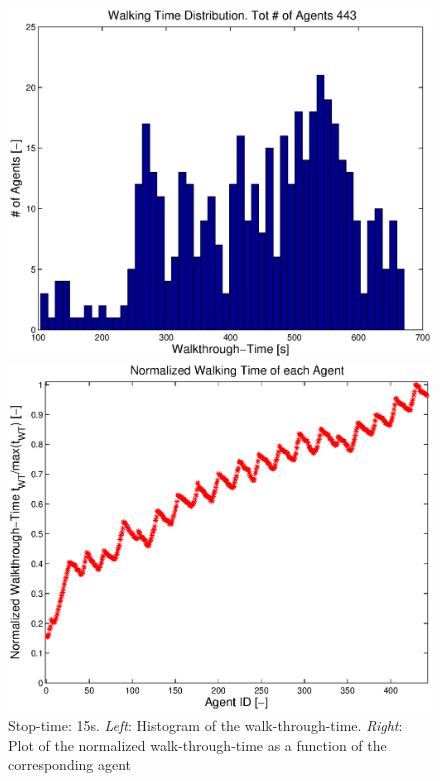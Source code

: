 \documentclass[11pt]{article}
\begin{document}
\begin{figure}[h]
 	\begin{minipage}{0.48\textwidth}
		\includegraphics[width = \textwidth]{Images/RESULTS03_Stop15/WalkingTimeHist.eps}
 	 \end{minipage}
  	\hfill
  	\begin{minipage}{0.48\textwidth}
   		 \includegraphics[width = \textwidth]{Images/RESULTS03_Stop15/NormalizedWalkingTimePlot.eps}
  	\end{minipage}
  	\caption{Stop-time: 15s. \emph{Left}: Histogram of the walk-through-time. \emph{Right}: Plot of the normalized walk-through-time as a function of the corresponding agent}
  	\label{img:stopTime15WTT}
\end{figure}
\end{document}
